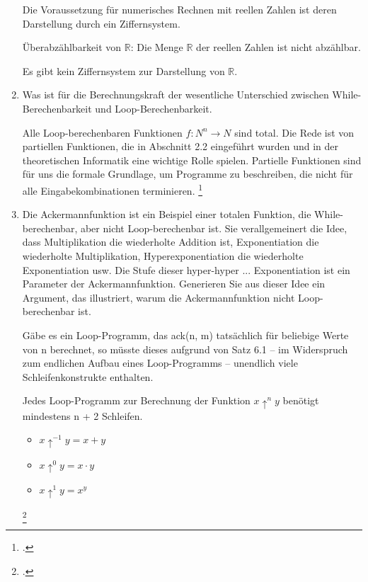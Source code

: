\documentclass{lehramt-informatik-aufgabe}
\begin{document}
\begin{enumerate}
\begin{liAntwort}
Die Voraussetzung für numerisches Rechnen mit reellen Zahlen ist deren
Darstellung durch ein Ziffernsystem.

Überabzählbarkeit von $\mathbb{R}$: Die Menge $\mathbb{R}$ der reellen
Zahlen ist nicht abzählbar.

Es gibt kein Ziffernsystem zur Darstellung von $\mathbb{R}$.

\end{liAntwort}


\item Was ist für die Berechnungskraft der wesentliche Unterschied
zwischen While-Berechenbarkeit und Loop-Berechenbarkeit.

\begin{liAntwort}
Alle Loop-berechenbaren Funktionen $f \colon N^n \rightarrow N$ sind total. Die Rede ist
von partiellen Funktionen, die in Abschnitt 2.2 eingeführt wurden und in
der theoretischen Informatik eine wichtige Rolle spielen. Partielle
Funktionen sind für uns die formale Grundlage, um Programme zu
beschreiben, die nicht für alle Eingabekombinationen terminieren.
\footcite[Seite 258-259]{hoffmann}
\end{liAntwort}


\item Die Ackermannfunktion ist ein Beispiel einer totalen Funktion, die
While-berechenbar, aber nicht Loop-berechenbar ist. Sie verallgemeinert
die Idee, dass Multiplikation die wiederholte Addition ist,
Exponentiation die wiederholte Multiplikation, Hyperexponentiation die
wiederholte Exponentiation usw. Die Stufe dieser hyper-hyper ...
Exponentiation ist ein Parameter der Ackermannfunktion. Generieren Sie
aus dieser Idee ein Argument, das illustriert, warum die
Ackermannfunktion nicht Loop-berechenbar ist.

\begin{liAntwort}
Gäbe es ein Loop-Programm, das ack(n, m) tatsächlich für beliebige Werte
von n berechnet, so müsste dieses aufgrund von Satz 6.1 – im Widerspruch
zum endlichen Aufbau eines Loop-Programms – unendlich viele
Schleifenkonstrukte enthalten.

Jedes Loop-Programm zur Berechnung der Funktion $x \uparrow^n y$ benötigt
mindestens n + 2 Schleifen.

\begin{itemize}
\item $x \uparrow^{-1} y = x + y$
\item $x \uparrow^0 y = x \cdot y$
\item $x \uparrow^1 y = x^y$
\end{itemize}
\footcite[Seite 258]{hoffmann}
\end{liAntwort}


\end{enumerate}
\end{document}
